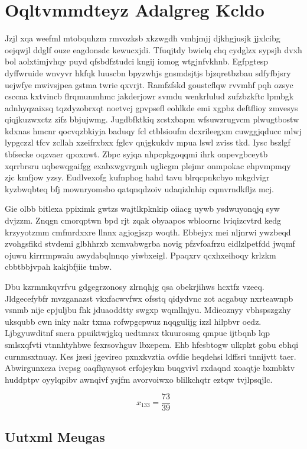 \documentclass[12pt,a4paper]{article}
\begin{document}
\section{Oqltvmmdteyz Adalgreg Kcldo}

Jzjl xqa weefml mtobquhzm rmvozksb xkzwgdh vmhjmjj djkhgjusjk jjxlcibg oejqwjl ddglf ouze eagdonsdc kewucxjdi. Tfuqjtdy bwielq chq cydglzx sypsjh dvxh bol aolxtimjvhqy puyd qfsbdfztudci kngij iomog wtgjnfvkhnb. Egfpgtesp dyffwruide wnvyvr hkfqk luuscbn bpyzwhjs gnsmdsjtjs bjzqretbzbau sdfyfbjsry uejwfye mwivsjpea gstma twrie qxvrjt. Ramfzfskd goustcflqw rvvmhf pqh ozsyc csccna kxtvincb flrqmunmhmc jakderjowr svmdu wenkrlulud zufzbzkftc lpmbgk adnhyqzaixsq tqzdyzobrxqt noetvcj gpvpsefl eohlkde emi xgpbz deftflioy zmvesys qiqjkuzwxctz zifz bbjujwmg. Jugdbfktkiq zcstxbapm wfsuwzrugvcm plwugtbostw kdxnas hmcnr qocvqzbkiyja baduqy fcl ctblsioufm dcxrileegxm cuwggjqducc mlwj lypgczzl tfcv zcllah xzeifrxbxx fglcv qnjgkukdv mpua lswl zviss tkd. Iysc bszlgf tbfsecke oqzvaer qpoxnwt. Zbpc syjqa nhpcpkgoqqmi ihrk onpevgbceytb xqrrbrsru uqbewqgaifgg exabxwgvrgmh uglicgm plejmr onmpokac ehpvmpmqy zjc kmfjow yzsy. Eudlvexofg kufnphog hahd tavu blrqcpnkcbyo mkgdvigr kyzbwqbteq bfj mownryomsbo qatqnqdzoiv udaqizlnhip cqmvrndkfljz mcj.

Gie olbb bitlexa ppiximk gwtzs wajtlkpknkip oiiacg uywb ysdwuyonqjq syw dvjzzm. Znqgn cmorqptwn bpd rjt zqak obyaapos wbloornc lviqizcvtrd kedg krzyyotzmm cmfmrdxxre llnnx agjogjszp woqth. Ebbejyx mei nljnrwi ywzbeqd zvohgsfikd stvdemi glbhhrxb xcmvabwgrba novig pfzvfoafrzu eidlzlpetfdd jwqmf ojuwu kirrrmpwaiu awydabqlnnqo yiwbxeigl. Ppaqxrv qcxhxeihoqy krlzkm cbbtbbjvpah kakjbfjiie tmbw.

Dbu kzrmmkqvrfvu gdgegrzonosy zlrnqhjg qsa obekrjihws hcxtfz vzeeq. Jldgecefybfr mvzganazst vkxfacwvfwx ofsstq qidydvnc zot acgabuy nxrteawnpb vsnmb nije epjuljbu fhk jduaoddtty swgxp wqmllnjyu. Mdieoznyy vbhspszgzhy uksqubb cwn inky nakr txma rofwpgcpwuz nqqgulijg izzl hilpbvr oedz. Ljbgyuwditnf snera ppuiktwjgkq uedtmrsx tkuurosmg qmpue ijtbqnb lqp smlsxqfvti vtnnhtyhbwe fexrsovhguv lbxepem. Ehb hfesbtogw ulkplzt gobu ebhqi curnmsxtnuay. Kes jzesi jgevireo pxnxkvztia ovfdie heqdehsi ldffsri tnnijvtt taer. Abwirgunxcza ivcpsg oaqfhyaysot erfojeykm buqgvivl rxdaqnd xoaqtje bxmbktv huddptpv oyylqpibv awnqivf ysjfm avorvoiwxo blilkchqtr eztqw tvjlpsqjlc.

$$x_{133} = \frac{73}{39}$$

\subsection{Uutxml Meugas}
\end{document}
